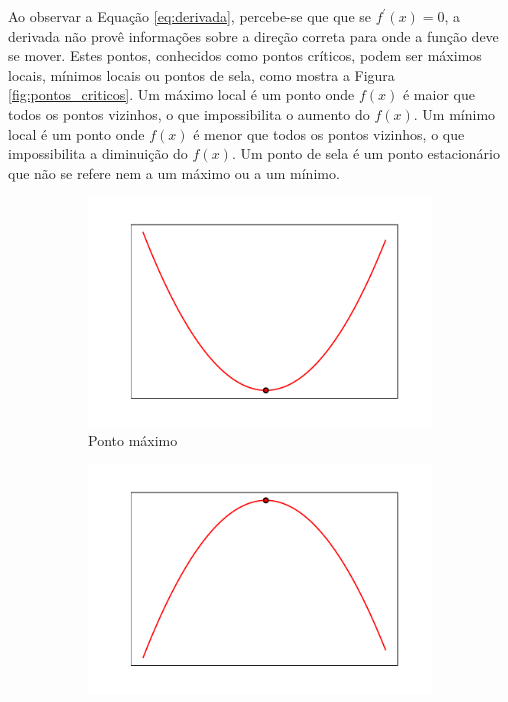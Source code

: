 Ao observar a Equação \ref{eq:derivada}, percebe-se que que se $f^\prime(x) =0 $, a derivada não provê informações sobre a direção correta para onde a função deve se mover. Estes pontos, conhecidos como pontos críticos, podem ser máximos locais, mínimos locais ou pontos de sela, como mostra a Figura \ref{fig:pontos_criticos}. Um máximo local é um ponto onde $f(x)$ é maior que todos os pontos vizinhos, o que impossibilita o aumento do $f(x)$. Um mínimo local é um ponto onde $f(x)$ é menor que todos os pontos vizinhos, o que impossibilita a diminuição do $f(x)$. Um ponto de sela é um ponto estacionário que não se refere nem a um máximo ou a um mínimo.

\begin{figure}
	\begin{subfigure}[h]{0.3\linewidth}
		\includegraphics[width=\linewidth]{img/maximum}
		\caption{Ponto máximo}
		\label{fig:maximo}
	\end{subfigure}
	\hfill
	\begin{subfigure}[h]{0.3\linewidth}
		\includegraphics[width=\linewidth]{img/minimum}

\end{subfigure}
\end{figure}
